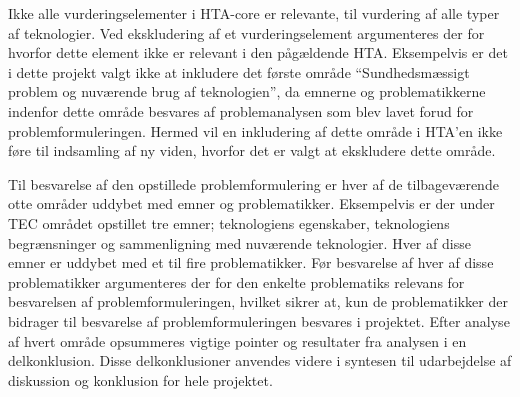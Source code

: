 Ikke alle vurderingselementer i HTA-core er relevante, til vurdering af alle typer af teknologier. Ved ekskludering af et vurderingselement argumenteres der for hvorfor dette element ikke er relevant i den pågældende HTA. \citep{HTAcore} Eksempelvis er det i dette projekt valgt ikke at inkludere det første område “Sundhedsmæssigt problem og nuværende brug af teknologien”, da emnerne og problematikkerne indenfor dette område besvares af problemanalysen som blev lavet forud for problemformuleringen. Hermed vil en inkludering af dette område i HTA’en ikke føre til indsamling af ny viden, hvorfor det er valgt at ekskludere dette område. 

Til besvarelse af den opstillede problemformulering er hver af de tilbageværende otte områder uddybet med emner og problematikker. Eksempelvis er der under TEC området opstillet tre emner; teknologiens egenskaber, teknologiens begrænsninger og sammenligning med nuværende teknologier. Hver af disse emner er uddybet med et til fire problematikker. Før besvarelse af hver af disse problematikker argumenteres der for den enkelte problematiks relevans for besvarelsen af problemformuleringen, hvilket sikrer at, kun de problematikker der bidrager til  besvarelse af problemformuleringen besvares i projektet. Efter analyse af hvert område opsummeres vigtige pointer og resultater fra analysen i en delkonklusion. Disse delkonklusioner anvendes videre i syntesen til udarbejdelse af diskussion og konklusion for hele projektet.    


\begingroup
\label{litteraturliste}
\raggedright


\endgroup







